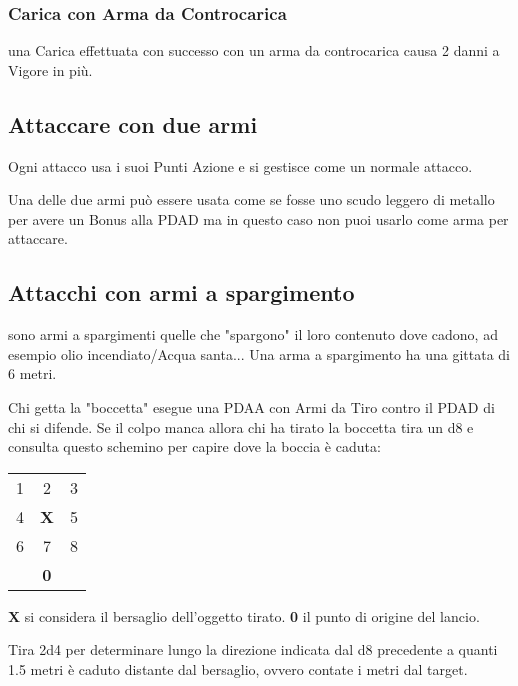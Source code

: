 \documentclass[12pt,a4paper,twoside,openany]{book}
\begin{document}
\begin{multicols}{2}
\subsubsection{Carica con Arma da Controcarica} \label{caricaarmadacontrocarica}

una Carica effettuata con successo con un arma da controcarica causa 2 danni a Vigore in più.

\subsection{Attaccare con due armi}

Ogni attacco usa i suoi Punti Azione e si gestisce come un normale attacco.

Una delle due armi può essere usata come se fosse uno scudo leggero di metallo per avere un Bonus alla PDAD ma in questo caso non puoi usarlo come arma per attaccare.

\subsection{Attacchi con armi a spargimento} \label{attacchiarmidaspargimento}\hypertarget{spargimento}{}

sono armi a spargimenti quelle che "spargono" il loro contenuto dove cadono, ad esempio olio incendiato/Acqua santa... Una arma a spargimento ha una gittata di 6 metri.

Chi getta la "boccetta" esegue una PDAA con Armi da Tiro contro il PDAD di chi si difende.
Se il colpo manca allora chi ha tirato la boccetta tira un d8 e consulta questo schemino per capire dove la boccia è caduta:

\medskip

\begin{tabularx}{0.30\textwidth}{ccc}
1& 2& 3\\
4 &\textbf{X}& 5\\
6 &7 &8\\
&\textbf{0}&\\
\end{tabularx}

\smallskip

\textbf{X} si considera il bersaglio dell'oggetto tirato. \textbf{0} il punto di origine del lancio.

Tira 2d4 per determinare lungo la direzione indicata dal d8 precedente a quanti 1.5 metri è caduto distante dal bersaglio, ovvero contate i metri dal target.


\end{multicols}
\end{document}
